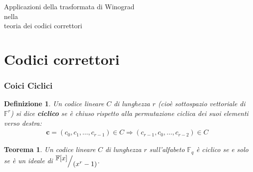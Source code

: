 \documentclass[mathserif]{beamer}
\def\quotient#1#2{%
   \raise1ex\hbox{$#1$}\Big/\lower1ex\hbox{$#2$}%
}
\newtheorem{definizione}{Definizione}
\newtheorem{teorema}{Teorema}
\newtheorem{prop}{Proprietà}
\begin{document}



\thispagestyle{empty}
\begin{frame}
   \begin{center}
      Applicazioni della trasformata di Winograd \\
      nella\\
      teoria dei codici correttori
   \end{center}
\end{frame}

\section{Codici correttori}
\begin{frame}
  \frametitle{Coici Ciclici}
    \begin{definizione}
    Un codice lineare $C$ di lunghezza $r$ (cioè sottospazio vettoriale di $\mathbb{F}^{r}$) si dice {\bf ciclico} se è chiuso rispetto alla permutazione ciclica dei suoi elementi verso destra:
    \begin{align*}
	\mathbf{c} = (c_{0},c_{1}, \dots , c_{r-1}) \in C \Longrightarrow (c_{r-1},c_{0}, \dots , c_{r-2}) \in C
    \end{align*}
    \end{definizione}
    \begin{teorema}
      Un codice lineare $C$ di lunghezza $r$ sull'alfabeto $\mathbb{F}_{q}$ è ciclico se e solo se è un ideale di $\quotient{\mathbb{F} \lbrack x \rbrack  }{ (x^{r} - 1)}$.
    \end{teorema}
\end{frame}
\end{document}
